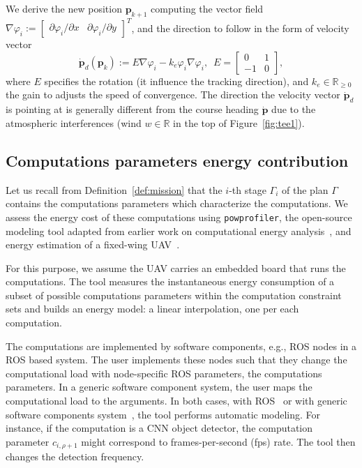 \documentclass[letterpaper,10pt,conference]{ieeeconf}
\newcommand{\stt}[1]{{\small\tt #1}} %
\newcommand{\powprof}{\stt{powprofiler}}
\theoremstyle{definition}
\begin{document}
We derive the new position $\mathbf{p}_{k+1}$ computing the vector field $\nabla\varphi_i:=\begin{bmatrix}\partial\varphi_i/\partial x & \partial\varphi_i/\partial y\end{bmatrix}^T$, and the direction to follow in the form of velocity vector~\cite{de2017guidance}
\begin{equation}\label{eq:pd}
  \dot{\mathbf{p}}_d(\mathbf{p}_k):=E\nabla\varphi_i-k_e\varphi_i\nabla\varphi_i,\,\,\,E=\begin{bmatrix}
    0&1\\-1&0
  \end{bmatrix},
\end{equation}
where $E$ specifies the rotation (it influence the tracking direction), and $k_e\in\mathbb{R}_{\geq 0}$ the gain to adjusts the speed of convergence. The direction the velocity vector $\dot{\mathbf{p}}_d$ is pointing at is generally different from the course heading $\dot{\mathbf{p}}$ due to the atmospheric interferences (wind $w\in\mathbb{R}$ in the top of Figure~\ref{fig:tee1}).

\subsection{Computations parameters energy contribution}
\label{sec:computations-model}

Let us recall from Definition~\ref{def:mission} that the $i$-th stage $\Gamma_i$ of the plan $\Gamma$ contains the computations parameters which characterize the computations. We assess the energy cost of these computations using \powprof{}, the open-source modeling tool adapted from earlier work on computational energy analysis~\cite{seewald2019coarse, seewald2019component}, and energy estimation of a fixed-wing UAV~\cite{seewald2020mechanical}. 

For this purpose, we assume the UAV carries an embedded board that runs the computations. The tool measures the instantaneous energy consumption of a subset of possible computations parameters within the computation constraint sets and builds an energy model: a linear interpolation, one per each computation. 

The computations are implemented by software components, e.g., ROS nodes in a ROS based system. The user implements these nodes such that they change the computational load with node-specific ROS parameters, the computations parameters. In a generic software component system, the user maps the computational load to the arguments. In both cases, with ROS~\cite{zamanakos2020energy} or with generic software components system~\cite{seewald2019component}, the tool performs automatic modeling. For instance, if the computation is a CNN object detector, the computation parameter $c_{i,\rho+1}$ might correspond to frames-per-second (fps) rate. The tool then changes the detection frequency.
\end{document}
